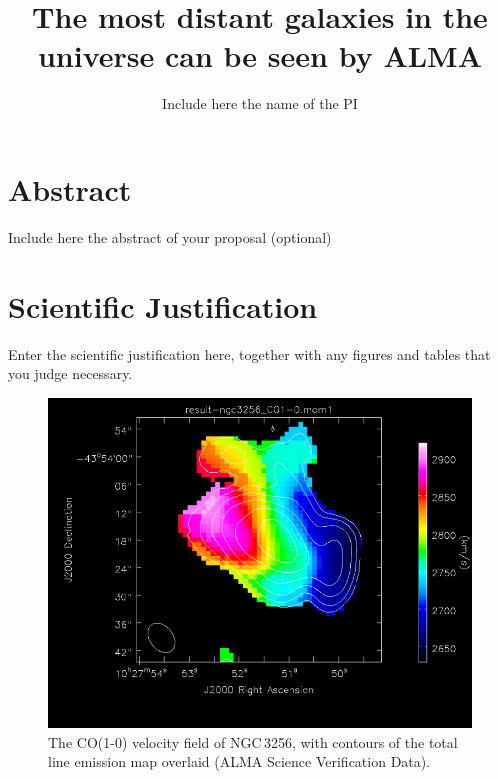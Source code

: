 \documentclass{alma_proposal}
\begin{document}
 

\title{The most distant galaxies in the universe can be seen by ALMA}
\author{Include here the name of the PI}
\maketitle



\section{Abstract}
Include here the abstract of your proposal (optional)



\section{Scientific Justification}

Enter the scientific justification here, together with any figures and tables that you judge necessary.
 
\begin{figure}[tbh]
\includegraphics[scale=0.2]{CO_velfield.png}
\caption{The CO(1-0) velocity field of NGC\,3256, with contours 
of the total line emission map overlaid (ALMA Science Verification Data).}
\end{figure}
\end{document}
